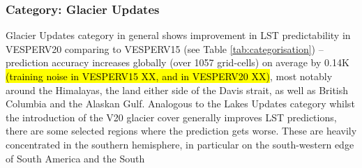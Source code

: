 \documentclass[hess, twostagejnl]{copernicus}
\begin{document}
\subsubsection{Category: Glacier Updates }
Glacier Updates category in general shows improvement in LST predictability in VESPERV20 comparing to VESPERV15 (see  Table  \ref{tab:categorisation})  –  prediction  accuracy  increases  globally  (over  1057  grid-cells)  on  average  by  0.14K  \hl{(training  noise  in VESPERV15 XX, and in VESPERV20 XX)}, most notably around the Himalayas, the land either side of the Davis strait, as well as British Columbia and the Alaskan Gulf. Analogous to the Lakes Updates category whilst the introduction of the V20 glacier cover generally improves LST predictions, there are some selected regions where the prediction gets worse. These are heavily  concentrated  in  the  southern  hemisphere,  in  particular  on  the  south-western  edge  of  South  America  and  the  South
\end{document}
